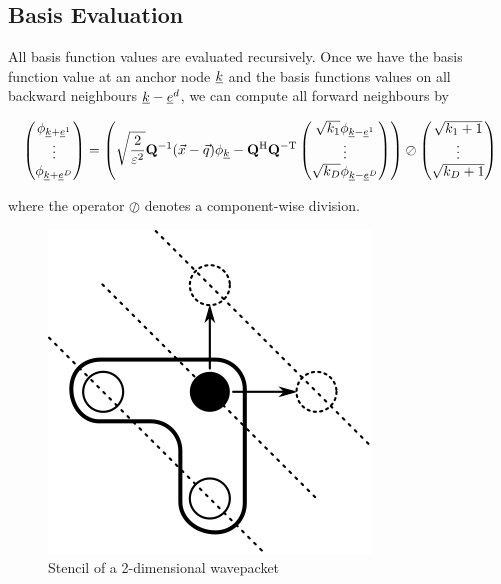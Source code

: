 \documentclass{article}
\begin{document}
\subsection{Basis Evaluation}

All basis function values are evaluated recursively. Once we have the basis function
value at an anchor node \(\underline{k}\) and the basis functions values on all
backward neighbours \(\underline{k}-\underline{e}^d\), we can compute all
forward neighbours by

\begin{equation}
  \begin{pmatrix}
    \phi_{\underline{k}+\underline{e}^1} \\
    \vdots \\
    \phi_{\underline{k}+\underline{e}^D}
  \end{pmatrix}
  = \left(
    \sqrt{\frac{2}{\varepsilon^2}} \mathbf{Q}^\mathrm{-1} (\vec{x}-\vec{q}) \phi_{\underline{k}}
    - \mathbf{Q}^\mathrm{H} \mathbf{Q}^\mathrm{-T}
    \begin{pmatrix}
      \sqrt{k_1} \phi_{\underline{k}-\underline{e}^1} \\
      \vdots \\
      \sqrt{k_D} \phi_{\underline{k}-\underline{e}^D}
    \end{pmatrix}
  \right)
  \oslash
  \begin{pmatrix}
    \sqrt{k_1+1}\\
    \vdots \\
    \sqrt{k_D+1}
  \end{pmatrix}
\end{equation}

where the operator \(\oslash\) denotes a component-wise division.

\begin{figure}[H]
  \centering
  \includegraphics[]{basis_eval_stencil}
  \caption{Stencil of a 2-dimensional wavepacket}
\end{figure}
\end{document}
